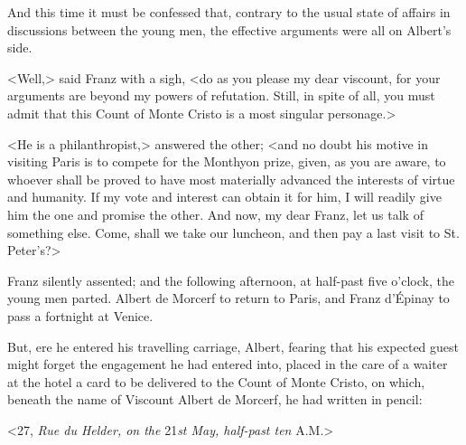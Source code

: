  And this time it must be confessed that, contrary to the usual state of affairs in discussions between the young men, the effective arguments were all on Albert's side. 

 <Well,> said Franz with a sigh, <do as you please my dear viscount, for your arguments are beyond my powers of refutation. Still, in spite of all, you must admit that this Count of Monte Cristo is a most singular personage.> 

 <He is a philanthropist,> answered the other; <and no doubt his motive in visiting Paris is to compete for the Monthyon prize, given, as you are aware, to whoever shall be proved to have most materially advanced the interests of virtue and humanity. If my vote and interest can obtain it for him, I will readily give him the one and promise the other. And now, my dear Franz, let us talk of something else. Come, shall we take our luncheon, and then pay a last visit to St. Peter's?> 

 Franz silently assented; and the following afternoon, at half-past five o'clock, the young men parted. Albert de Morcerf to return to Paris, and Franz d'Épinay to pass a fortnight at Venice. 

 But, ere he entered his travelling carriage, Albert, fearing that his expected guest might forget the engagement he had entered into, placed in the care of a waiter at the hotel a card to be delivered to the Count of Monte Cristo, on which, beneath the name of Viscount Albert de Morcerf, he had written in pencil: 

 <27, \textit{Rue du Helder, on the} 21\textit{st May, half-past ten} A.M.> 